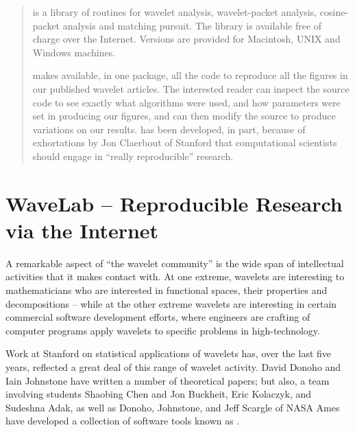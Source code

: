 \newcommand{\MinSize}{2~Mb\ }            %
\newcommand{\MaxSize}{4.5~Mb\ }

\newcommand{\bitem}{\begin{itemize}}
\newcommand{\eitem}{\end{itemize}}
\newcommand{\benum}{\begin{enumerate}}
\newcommand{\eenum}{\end{enumerate}}
\newcommand{\bquote}{\begin{quotation}}
\newcommand{\equote}{\end{quotation}}

\begin{abstract}
\WaveLab is a library of \Matlab routines for wavelet analysis, wavelet-packet
analysis, cosine-packet analysis and matching pursuit. The library is available
free of charge over the Internet.   Versions are provided for Macintosh, UNIX
and Windows machines.

\WaveLab makes available, in one package, all the code to reproduce all the
figures in our published wavelet articles. The interested reader can inspect the
source code to see exactly what algorithms were used, and how parameters were
set in producing our figures, and can then modify the source to produce
variations on our results. \WaveLab has been developed, in part, because of
exhortations by Jon Claerbout of Stanford that computational scientists should
engage in ``really reproducible'' research. 
\end{abstract}

\section{WaveLab -- Reproducible Research via the Internet}

A remarkable aspect of ``the wavelet community'' is the wide span of intellectual activities
that it makes contact with.  At one extreme, wavelets are interesting to mathematicians who
are interested in functional spaces, their properties and decompositions -- while at the
other extreme wavelets are interesting in certain commercial software development
efforts, where engineers are crafting of computer programs apply wavelets to
specific problems in high-technology.

Work at Stanford on statistical applications of wavelets has, over the last five years,
reflected a great deal of this range of wavelet activity. David Donoho and Iain Johnstone
have written a number of theoretical papers; but also, a team involving 
students Shaobing Chen and Jon Buckheit, Eric Kolaczyk, and Sudeshna Adak, as
well as Donoho, Johnstone, and Jeff Scargle of NASA Ames have 
developed a collection of software tools known as
\WaveLab.

